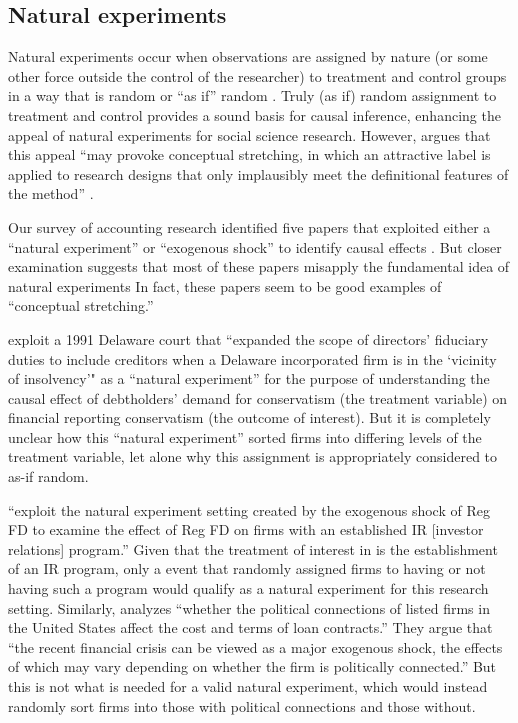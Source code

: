 \documentclass[11pt,reqno]{amsart}
\begin{document}

\subsection{Natural experiments}
Natural experiments occur when observations are assigned by nature (or some other force outside the control of the researcher) to treatment and control groups in a way that is random or ``as if'' random \citep{Dunning:2012tt}. 
Truly (as if) random assignment to treatment and control provides a sound basis for causal inference, enhancing the appeal of natural experiments for social science research.
However, argues that this appeal ``may provoke conceptual stretching, in which an attractive label is applied to research designs that only implausibly meet the definitional features of the method'' \citep[p.3]{Dunning:2012tt}.

Our survey of accounting research identified five papers that exploited either a ``natural experiment'' or ``exogenous shock'' to identify causal effects \citep{Lo:2013jk,Aier:2014ii,Kirk:2014gx,Houston:2014hv,Hail:2014fq}.
But closer examination suggests that most of these papers misapply the fundamental idea of natural experiments  In fact, these papers seem to be good examples of ``conceptual stretching.''

\cite{Aier:2014ii} exploit a 1991 Delaware court that ``expanded the scope of directors' fiduciary duties to include creditors when a Delaware incorporated firm is in the `vicinity of insolvency'" as a ``natural experiment'' for the purpose of understanding the causal effect of debtholders' demand for conservatism (the treatment variable) on financial reporting conservatism (the outcome of interest).
But it is completely unclear how this ``natural experiment'' sorted firms into differing levels of the treatment variable, let alone why this assignment is appropriately considered to as-if random.

\citet{Kirk:2014gx} ``exploit the natural experiment setting created by the exogenous shock of Reg FD to examine the effect of Reg FD on firms with an established IR [investor relations] program.'' 
Given that the treatment of interest in \citet{Kirk:2014gx} is the establishment of an IR program, only a event that randomly assigned firms to having or not having such a program would qualify as a natural experiment for this research setting. Similarly, \citet{Houston:2014hv} analyzes ``whether the political connections of listed firms in the United States affect the cost and terms of loan contracts.'' They argue that ``the recent financial crisis can be viewed as a major exogenous shock, the effects of which may vary depending on whether the firm is politically connected.'' 
But this is not what is needed for a valid natural experiment, which would instead randomly sort firms into those with political connections and those without. 
\end{document}
